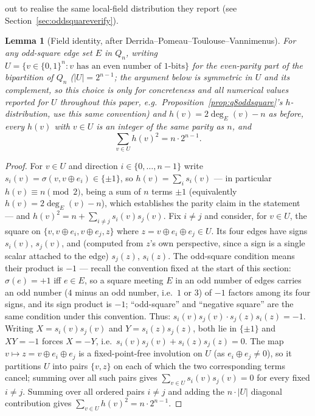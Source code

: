 \documentclass[12pt,a4paper]{article}
\newtheorem{lemma}[theorem]{Lemma}
\theoremstyle{definition}
\begin{document}
out to realise the same local-field distribution they report (see
Section~\ref{sec:oddsquareverify}).

\begin{lemma}[Field identity, after Derrida--Pomeau--Toulouse--Vannimenus]\label{lem:fieldbound}
For any odd-square edge set $E$ in $Q_n$, writing $U=\{v\in\{0,1\}^n:
v \text{ has an even number of } 1\text{-bits}\}$ for the
even-parity part of
the bipartition of $Q_n$ ($|U|=2^{n-1}$; the argument below is
symmetric in $U$ and its complement, so this choice is only for
concreteness and all numerical values reported for $U$ throughout this
paper, e.g.\ Proposition~\ref{prop:q8oddsquare}'s $h$-distribution,
use this same convention) and $h(v)=2\deg_E(v)-n$ as before, every
$h(v)$ with $v\in U$ is an integer of the same parity as $n$, and
\[
\sum_{v\in U}h(v)^2=n\cdot2^{n-1}.
\]
\end{lemma}
\begin{proof}
For $v\in U$ and direction $i\in\{0,\ldots,n-1\}$ write
$s_i(v)=\sigma(v,v\oplus e_i)\in\{\pm1\}$, so $h(v)=\sum_i s_i(v)$ ---
in particular $h(v)\equiv n\pmod2$, being a sum of $n$ terms $\pm1$
(equivalently $h(v)=2\deg_E(v)-n$), which establishes the parity claim
in the statement --- and
$h(v)^2=n+\sum_{i\ne j}s_i(v)s_j(v)$. Fix $i\ne j$ and consider, for
$v\in U$, the square on $\{v,v\oplus e_i,v\oplus e_j,z\}$ where
$z=v\oplus e_i\oplus e_j\in U$. Its four edges have signs $s_i(v)$,
$s_j(v)$, and (computed from $z$'s own perspective, since a sign is a
single scalar attached to the edge) $s_j(z)$, $s_i(z)$. The odd-square
condition means their product is $-1$ --- recall the convention fixed at
the start of this section: $\sigma(e)=+1$ iff $e\in E$, so a square
meeting $E$ in an odd number of edges carries an odd number ($4$ minus an
odd number, i.e.\ $1$ or $3$) of $-1$ factors among its four signs, and
its sign product is $-1$; ``odd-square'' and ``negative square'' are the
same condition under this convention. Thus:
$s_i(v)s_j(v)\cdot s_j(z)s_i(z)=-1$. Writing $X=s_i(v)s_j(v)$ and
$Y=s_i(z)s_j(z)$, both lie in $\{\pm1\}$ and $XY=-1$ forces $X=-Y$, i.e.\
$s_i(v)s_j(v)+s_i(z)s_j(z)=0$. The map $v\mapsto z=v\oplus e_i\oplus e_j$
is a fixed-point-free involution on $U$ (as $e_i\oplus e_j\ne0$), so it
partitions $U$ into pairs $\{v,z\}$ on each of which the two
corresponding terms cancel; summing over all such pairs gives
$\sum_{v\in U}s_i(v)s_j(v)=0$ for every fixed $i\ne j$. Summing over all
ordered pairs $i\ne j$ and adding the $n\cdot|U|$ diagonal contribution
gives $\sum_{v\in U}h(v)^2=n\cdot2^{n-1}$.
\end{proof}
\end{document}
